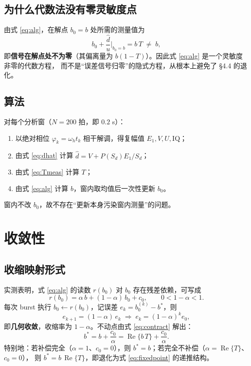 \documentclass[11pt,a4paper]{ctexart}
\newcommand{\RE}{\operatorname{Re}}
\begin{document}
\subsection{为什么代数法没有零灵敏度点}

由式 \eqref{eq:alg}，在解点 $b_0=b$ 处所需的测量值为
\begin{equation}
b_0+\frac{\hat d}{u}\Big|_{b_0=b}=b\,T\;\neq\;b ,
\label{eq:nonzero}
\end{equation}
即\textbf{信号在解点处不为零}（其偏离量为 $b(1-T)$）。因此式 \eqref{eq:alg} 是一个灵敏度非零的代数方程，
而不是“误差信号归零”的隐式方程，从根本上避免了 \S 4.4 的退化。

\subsection{算法}

对每个分析窗（$N=200$ 拍，即 $0.2$ s）：
\begin{enumerate}
\item 以绝对相位 $\varphi_k=\omega_ht_k$ 相干解调，得复幅值 $E_1,V,U,\mathrm{IQ}$；
\item 由式 \eqref{eq:dhat} 计算 $\hat d=V+P(S_d)E_1/S_d$；
\item 由式 \eqref{eq:Tmeas} 计算 $T$；
\item 由式 \eqref{eq:alg} 计算 $b$，窗内取均值后一次性更新 $b_0$。
\end{enumerate}
窗内不改 $b_0$，故不存在“更新本身污染窗内测量”的问题。

\section{收敛性}

\subsection{收缩映射形式}

实测表明，式 \eqref{eq:alg} 的读数 $r(b_0)$ 对 $b_0$ 存在残差依赖，可写成
\begin{equation}
r(b_0)=\alpha\,b+(1-\alpha)\,b_0+c_0 ,\qquad 0<1-\alpha<1 .
\label{eq:contract}
\end{equation}
每次 burst 执行 $b_0\leftarrow r(b_0)$，记误差 $e_k=b_0^{(k)}-b^*$，则
\begin{equation}
e_{k+1}=(1-\alpha)\,e_k\;\Longrightarrow\;e_k=(1-\alpha)^k e_0 ,
\label{eq:geom}
\end{equation}
即\textbf{几何收敛}，收缩率为 $1-\alpha$。不动点由式 \eqref{eq:contract} 解出：
\begin{equation}
b^*=b+\frac{c_0}{\alpha}=\RE\big\{b\,T\big\}+\frac{c_0}{\alpha}.
\label{eq:bstar}
\end{equation}
特别地：若补偿完全（$\alpha=1$、$c_0=0$），则 $b^*=b$；若完全不补偿（$\alpha=\RE\{T\}$、$c_0=0$），
则 $b^*=b\,\RE\{T\}$，即退化为式 \eqref{eq:fixedpoint} 的递推结构。
\end{document}
